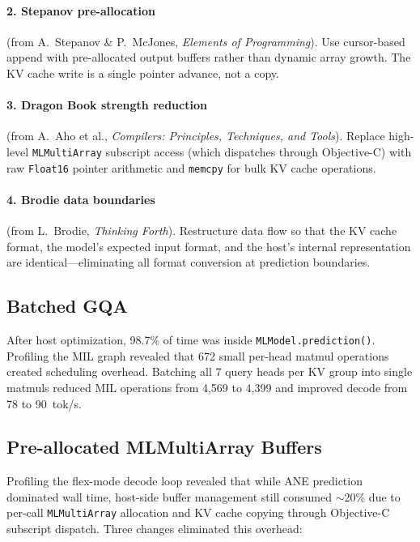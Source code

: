 \documentclass[11pt,twocolumn]{article}
\begin{document}
\paragraph{2. Stepanov pre-allocation} (from A.~Stepanov \& P.~McJones,
\textit{Elements of Programming}). Use cursor-based append with
pre-allocated output buffers rather than dynamic array growth. The KV
cache write is a single pointer advance, not a copy.

\paragraph{3. Dragon Book strength reduction} (from A.~Aho et al.,
\textit{Compilers: Principles, Techniques, and Tools}). Replace
high-level \texttt{MLMultiArray} subscript access (which dispatches
through Objective-C) with raw \texttt{Float16} pointer arithmetic and
\texttt{memcpy} for bulk KV cache operations.

\paragraph{4. Brodie data boundaries} (from L.~Brodie,
\textit{Thinking Forth}). Restructure data flow so that the KV cache
format, the model's expected input format, and the host's internal
representation are identical---eliminating all format conversion at
prediction boundaries.

\subsection{Batched GQA}

After host optimization, 98.7\% of time was inside
\texttt{MLModel.prediction()}. Profiling the MIL graph revealed that
672 small per-head matmul operations created scheduling overhead.
Batching all 7 query heads per KV group into single matmuls reduced
MIL operations from 4,569 to 4,399 and improved decode from 78 to
90~tok/s.

\subsection{Pre-allocated MLMultiArray Buffers}

Profiling the flex-mode decode loop revealed that while ANE prediction
dominated wall time, host-side buffer management still consumed
$\sim$20\% due to per-call \texttt{MLMultiArray} allocation and KV
cache copying through Objective-C subscript dispatch. Three changes
eliminated this overhead:
\end{document}
